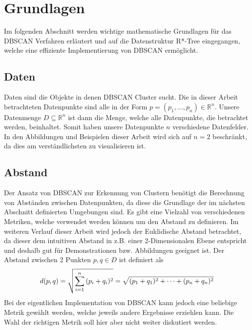 \documentclass{lni}
\begin{document}
%
%

\section{Grundlagen}
\label{sec:grund}
Im folgenden Abschnitt werden wichtige mathematische Grundlagen für das DBSCAN Verfahren erläutert und auf die Datenstruktur R*-Tree eingegangen, welche eine effiziente Implementierung von DBSCAN ermöglicht.


\subsection{Daten}
Daten sind die Objekte in denen DBSCAN Cluster sucht. Die in dieser Arbeit betrachteten Datenpunkte sind alle in der Form $p = (p_1, \dots, p_n) \in \mathbb{R}^n$.
Unsere Datenmenge $D \subseteq \mathbb{R}^n$ ist dann die Menge, welche alle Datenpunkte, die betrachtet werden, beinhaltet. Somit haben unsere Datenpunkte $n$ verschiedene Datenfelder. In den Abbildungen und Beispielen dieser Arbeit wird sich auf $n=2$ beschränkt, da dies am verständlichsten zu visualisieren ist.


\subsection{Abstand}
Der Ansatz von DBSCAN zur Erkennung von Clustern benötigt die Berechnung von Abständen zwischen Datenpunkten, da diese die Grundlage der im nächsten Abschnitt definierten Umgebungen sind. Es gibt eine Vielzahl von verschiedenen Metriken, welche verwendet werden können um den Abstand zu definieren. Im weiteren Verlauf dieser Arbeit wird jedoch der Euklidische Abstand betrachtet, da dieser dem intuitiven Abstand in z.B. einer 2-Dimensionalen Ebene entspricht und deshalb gut für Demonstrationen bzw. Abbildungen geeignet ist. Der Abstand zwischen 2 Punkten $p,q \in D$ ist definiert als
\begin{align}
    d(p,q) = \sqrt{\sum_{i=1}^{n}{(p_i+q_i)^2}} = \sqrt{(p_1+q_1)^2 + \dots + (p_n+q_n)^2} \notag
\end{align}
Bei der eigentlichen Implementation von DBSCAN kann jedoch eine beliebige Metrik gewählt werden, welche jeweils andere Ergebnisse erziehlen kann.
Die Wahl der richtigen Metrik soll hier aber nicht weiter diskutiert werden.

\end{document}
